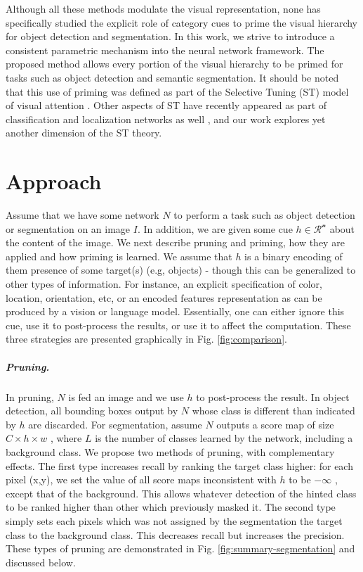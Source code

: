 \documentclass[10pt,letterpaper,twocolumn]{article}
\begin{document}
Although all these methods modulate the visual representation, none
has specifically studied the explicit role of category cues to prime
the visual hierarchy for object detection and segmentation. In this
work, we strive to introduce a consistent parametric mechanism into
the neural network framework. The proposed method allows every portion
of the visual hierarchy to be primed for tasks such as object detection
and semantic segmentation. It should be noted that this use of priming
was defined as part of the Selective Tuning (ST) model of visual attention
\cite{tsotsos1995SelTun}. Other aspects of ST have recently appeared
as part of classification and localization networks as well \cite{biparva2017stnet,zhang2016top},
and our work explores yet another dimension of the ST theory.

\section{Approach\label{sec:Approach}}

Assume that we have some network $N$ to perform a task such as object
detection or segmentation on an image $I$. In addition, we are given
some cue $h\in\mathcal{R^{\text{n}}}$ about the content of the image.
We next describe pruning and priming, how they are applied and how
priming is learned. We assume that $h$ is a binary encoding of them
presence of some target(s) (e.g, objects) - though this can be generalized
to other types of information. For instance, an explicit specification
of color, location, orientation, etc, or an encoded features representation
as can be produced by a vision or language model. Essentially, one
can either ignore this cue, use it to post-process the results, or
use it to affect the computation. These three strategies are presented
graphically in Fig. \ref{fig:comparison}.

\subparagraph{Pruning.\label{par:Pruning}}

In pruning, $N$ is fed an image and we use $h$ to post-process the
result. In object detection, all bounding boxes output by $N$ whose
class is different than indicated by $h$ are discarded. For segmentation,
assume $N$ outputs a score map of size $C\times h\times w$ , where
$L$ is the number of classes learned by the network, including a
background class. We propose two methods of pruning, with complementary
effects. The first type increases recall by ranking the target class
higher: for each pixel (x,y), we set the value of all score maps inconsistent
with $h$ to be $-\infty$ , except that of the background. This allows
whatever detection of the hinted class to be ranked higher than other
which previously masked it. The second type simply sets each pixels
which was not assigned by the segmentation the target class to the
background class. This decreases recall but increases the precision.
These types of pruning are demonstrated in Fig. \ref{fig:summary-segmentation}
and discussed below.
\end{document}

